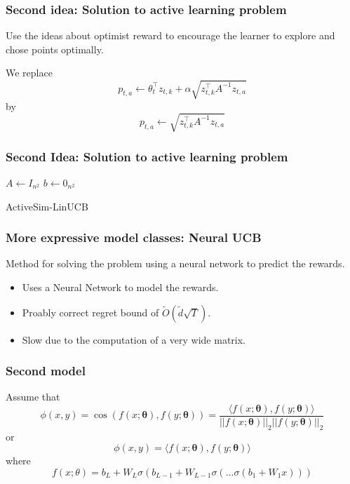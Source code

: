 \documentclass{beamer}
\begin{document}
\begin{frame}{}
    \frametitle{Second idea: Solution to active learning problem}
    Use the ideas about optimist reward to encourage the learner to explore and chose points
    optimally.

    We replace
    \[ p_{t,a} \gets \theta_t^\top z_{t,k} + \alpha \sqrt{z_{t,k}^\top A^{-1} z_{t,a}} \]
    by
    \[ p_{t,a} \gets \sqrt{z_{t,k}^\top A^{-1} z_{t,a}} \]
\end{frame}

\begin{frame}{}
    \frametitle{Second Idea: Solution to active learning problem}
    {\small
    \begin{algorithm}[H]
          $A \gets I_{n^2}$\;
          $b \gets 0_{n^2}$\;
          \caption{ActiveSim-LinUCB}
      \end{algorithm}
    }
\end{frame}


\begin{frame}{}
    \frametitle{More expressive model classes: Neural UCB}
    Method for solving the problem using a neural network to predict the rewards.
    \begin{itemize}
        \item Uses a Neural Network to model the rewards.
        \item Proably correct regret bound of $\tilde{O}(\tilde{d}\sqrt{T})$.
        \item Slow due to the computation of a very wide matrix.
    \end{itemize}
\end{frame}


\begin{frame}{}
    \frametitle{Second model}
    Assume that
    \[ \phi(x,y) = \cos\left(f(x;\mathbf{\theta}), f(y;\mathbf{\theta})\right) = \frac{\langle f(x;\mathbf{\theta}), f(y;\mathbf{\theta}) \rangle}{||f(x;\mathbf{\theta})||_2 ||f(y;\mathbf{\theta})||_2}\]
    or
    \[ \phi(x,y) = \langle f(x;\mathbf{\theta}), f(y;\mathbf{\theta}) \rangle \]
    where
    \[ f(x; \theta) = b_L + W_{L} \sigma\left(b_{L-1} +  W_{L-1} \sigma\left( \dots \sigma\left(b_1 + W_1 x\right)\right) \right)\]

    \vspace{1cm}
\end{frame}
\end{document}
